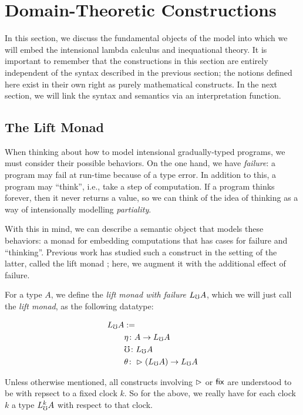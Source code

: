 \section{Domain-Theoretic Constructions}\label{sec:domain-theory}

In this section, we discuss the fundamental objects of the model into which we will embed
the intensional lambda calculus and inequational theory. It is important to remember that
the constructions in this section are entirely independent of the syntax described in the
previous section; the notions defined here exist in their own right as purely mathematical
constructs. In the next section, we will link the syntax and semantics via an interpretation
function.

\subsection{The Lift Monad}

When thinking about how to model intensional gradually-typed programs, we must consider
their possible behaviors. On the one hand, we have \emph{failure}: a program may fail
at run-time because of a type error. In addition to this, a program may ``think'',
i.e., take a step of computation. If a program thinks forever, then it never returns a value,
so we can think of the idea of thinking as a way of intensionally modelling \emph{partiality}.

With this in mind, we can describe a semantic object that models these behaviors: a monad
for embedding computations that has cases for failure and ``thinking''.
Previous work has studied such a construct in the setting of the latter, called the lift
monad \cite{mogelberg-paviotti2016}; here, we augment it with the additional effect of failure.

For a type $A$, we define the \emph{lift monad with failure} $L_\mho A$, which we will just call
the \emph{lift monad}, as the following datatype:

\begin{align*}
  L_\mho A &:= \\
  &\eta \colon A \to L_\mho A \\
  &\mho \colon L_\mho A \\
  &\theta \colon \vartriangleright (L_\mho A) \to L_\mho A
\end{align*}

Unless otherwise mentioned, all constructs involving $\vartriangleright$ or $\mathsf{fix}$
are understood to be with repsect to a fixed clock $k$. So for the above, we really have for each
clock $k$ a type $L_\mho^k A$ with respect to that clock.

